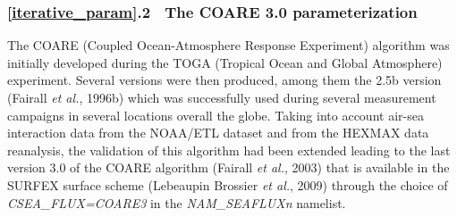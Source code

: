 \subsubsection{\ref{iterative_param}.2 $~$ The COARE 3.0 parameterization\label{sct_COARE}}

The COARE (Coupled Ocean-Atmosphere Response Experiment) algorithm was initially developed during the TOGA 
(Tropical Ocean and Global Atmosphere) experiment.
Several versions were then produced, among them the 2.5b version (Fairall \textit{ et al.}, 1996b) which
was successfully used during several measurement campaigns in several locations overall the globe. 
Taking into account air-sea interaction data from the NOAA/ETL dataset and from the HEXMAX data reanalysis, 
the validation of this algorithm had been extended leading to the last version 3.0 of the COARE algorithm (Fairall \textit{ et al.}, 2003)
that is available in the SURFEX surface scheme (Lebeaupin Brossier \textit{ et al.}, 2009\nocite{lebeaupin2009}) 
through the choice of \textit{CSEA\_FLUX=\textquotesingle{}COARE3\textquotesingle{}} in the \textit{NAM\_SEAFLUXn} namelist.\\

